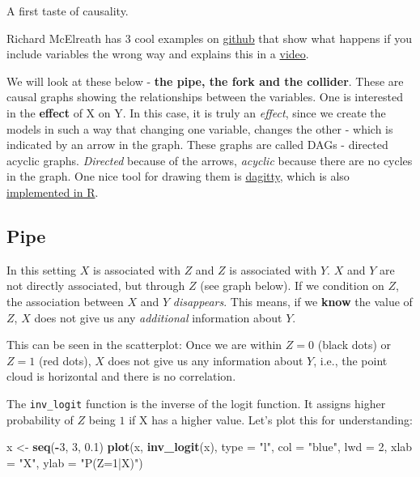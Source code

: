 \documentclass[
]{book}
\newenvironment{Shaded}{\begin{snugshade}}{\end{snugshade}}
\newcommand{\AttributeTok}[1]{\textcolor[rgb]{0.13,0.29,0.53}{#1}}
\newcommand{\DecValTok}[1]{\textcolor[rgb]{0.00,0.00,0.81}{#1}}
\newcommand{\FloatTok}[1]{\textcolor[rgb]{0.00,0.00,0.81}{#1}}
\newcommand{\FunctionTok}[1]{\textcolor[rgb]{0.13,0.29,0.53}{\textbf{#1}}}
\newcommand{\NormalTok}[1]{#1}
\newcommand{\OtherTok}[1]{\textcolor[rgb]{0.56,0.35,0.01}{#1}}
\newcommand{\SpecialCharTok}[1]{\textcolor[rgb]{0.81,0.36,0.00}{\textbf{#1}}}
\newcommand{\StringTok}[1]{\textcolor[rgb]{0.31,0.60,0.02}{#1}}
\begin{document}
A first taste of causality.

Richard McElreath has 3 cool examples on
\href{https://github.com/rmcelreath/causal_salad_2021/blob/main/1_causal_salad.r}{github}
that show what happens if you include variables the wrong way and explains this in a
\href{https://www.youtube.com/watch?v=KNPYUVmY3NM&ab_channel=RichardMcElreath}{video}.

We will look at these below - \textbf{the pipe, the fork and the collider}. These are causal graphs showing the
relationships between the variables. One is interested in the \textbf{effect} of X on Y.
In this case, it is truly an \emph{effect}, since we create the models in such a way that changing
one variable, changes the other - which is indicated by an arrow in the graph.
These graphs are called DAGs - directed acyclic graphs. \emph{Directed} because of the arrows,
\emph{acyclic} because there are no cycles in the graph. One nice tool for drawing them is
\href{https://www.dagitty.net/}{dagitty}, which is also \href{https://cran.r-project.org/web/packages/dagitty/index.html}{implemented in R}.

\subsection{Pipe}\label{pipe}

In this setting \(X\) is associated with \(Z\) and \(Z\) is associated with \(Y\).
\(X\) and \(Y\) are not directly associated, but through \(Z\) (see graph below).
If we condition on \(Z\), the association between \(X\) and \(Y\) \emph{disappears}.
This means, if we \textbf{know} the value of \(Z\), \(X\) does not give us any \emph{additional} information about \(Y\).

This can be seen in the scatterplot: Once we are within \(Z=0\) (black dots) or \(Z=1\) (red dots),
\(X\) does not give us any information about \(Y\),
i.e., the point cloud is horizontal and there is no correlation.

The \texttt{inv\_logit} function is the inverse of the logit function.
It assigns higher probability of \(Z\) being \(1\) if X has a higher value.
Let's plot this for understanding:

\begin{Shaded}
\begin{Highlighting}[]
\NormalTok{x }\OtherTok{\textless{}{-}} \FunctionTok{seq}\NormalTok{(}\SpecialCharTok{{-}}\DecValTok{3}\NormalTok{, }\DecValTok{3}\NormalTok{, }\FloatTok{0.1}\NormalTok{)}
\FunctionTok{plot}\NormalTok{(x, }\FunctionTok{inv\_logit}\NormalTok{(x), }\AttributeTok{type =} \StringTok{"l"}\NormalTok{, }\AttributeTok{col =} \StringTok{"blue"}\NormalTok{, }\AttributeTok{lwd =} \DecValTok{2}\NormalTok{, }\AttributeTok{xlab =} \StringTok{"X"}\NormalTok{, }\AttributeTok{ylab =} \StringTok{"P(Z=1|X)"}\NormalTok{)}
\end{Highlighting}
\end{Shaded}
\end{document}
